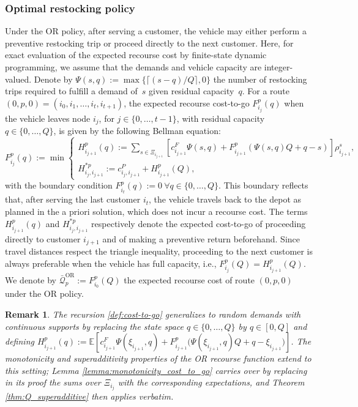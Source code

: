 \documentclass{article}
\newtheorem{remark}{Remark}
\newcommand{\rev}[1]{{\color{black}#1}}
\begin{document}
\subsubsection{Optimal restocking policy}\label{sec:OR_pol}

\rev{Under the OR policy, after serving a customer, the vehicle may either perform a preventive restocking trip or proceed directly to the next customer. Here, for exact evaluation of the expected recourse cost by finite-state dynamic programming, we assume that the demands and vehicle capacity are integer-valued.} Denote by $\Psi(s,q) := \max\{\lceil(s - q)/Q\rceil,0\}$ the number of restocking trips required to fulfill a demand of~$s$ given residual capacity~$q$. For a route $(0, p, 0) = (i_0, i_{1}, \dots, i_{t}, i_{t+1})$, the expected recourse cost-to-go $F^{p}_{i_{j}}(q)$ when the vehicle leaves node $i_{j}$, for $j \in \{0,\dots,t{-}1\}$, with residual capacity $q \in \{0,\dots,Q\}$, is given by the following Bellman equation:
\begin{equation}
    F^p_{i_j}(q) := \min
    \begin{cases} \label{def:cost-to-go}
        H^p_{i_{j+1}}(q) := \sum\limits_{s \in \Xi_{i_{j+1}}} \left[c_{i_{j+1}}^F\Psi(s,q) + F^p_{i_{j+1}}\left(\Psi(s,q)Q + q -s  \right) \right]\rho_{i_{j+1}}^s, \\
        H^{*p}_{i_j,i_{j+1}} := c_{i_j, i_{j+1}}^P+H^p_{i_{j+1}}(Q),
    \end{cases}
\end{equation}
with the boundary condition $F^p_{i_{t}}(q):=0 \ \forall q \in \{0,\dots,Q\}$. This boundary reflects that, after serving the last customer $i_{t}$, the vehicle travels back to the depot as planned in the a priori solution, which does not incur a recourse cost. The terms $H^p_{i_{j+1}}(q)$ and $H^{*p}_{i_j,i_{j+1}}$ respectively denote the expected cost-to-go of proceeding directly to customer $i_{j+1}$ and of making a preventive return beforehand. Since travel distances respect the triangle inequality, proceeding to the next customer is always preferable when the vehicle has full capacity, i.e., $F^p_{i_j}(Q) = H^p_{i_{j+1}}(Q)$. We denote by $\bar{\mathcal{Q}}^{\text{OR}}_p:=F^p_{i_0}(Q)$ the expected recourse cost of route $(0,p,0)$ under the OR policy.

\begin{remark}\label{rem:OR-continuous}
    The recursion \eqref{def:cost-to-go} generalizes to random demands with continuous supports by replacing the state space $q \in \{0, \dots, Q\}$ by $q \in [0, Q]$ and defining $H^p_{i_{j+1}}(q) := \mathbb{E}\!\left[c^F_{i_{j+1}} \Psi(\xi_{i_{j+1}}, q) + F^p_{i_{j+1}}\big(\Psi(\xi_{i_{j+1}}, q)Q + q - \xi_{i_{j+1}}\big)\right]$. The monotonicity and superadditivity properties of the OR recourse function extend to this setting; Lemma \ref{lemma:monotonicity_cost_to_go} carries over by replacing in its proof the sums over $\Xi_{i_j}$ with the corresponding expectations, and Theorem \ref{thm:Q_superadditive} then applies verbatim.
\end{remark}
 
\end{document}
